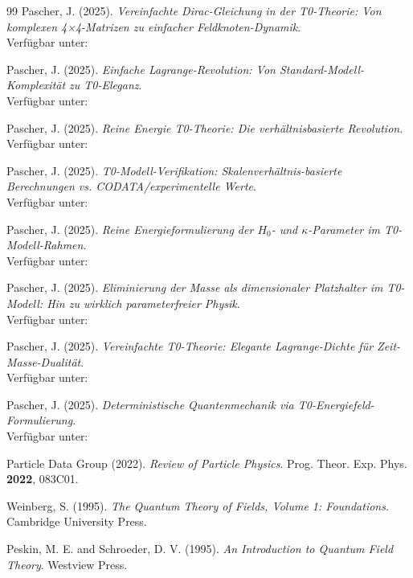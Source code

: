	\begin{thebibliography}{99}
		Pascher, J. (2025). \textit{Vereinfachte Dirac-Gleichung in der T0-Theorie: Von komplexen 4×4-Matrizen zu einfacher Feldknoten-Dynamik}. \\
		Verfügbar unter: 
		
		Pascher, J. (2025). \textit{Einfache Lagrange-Revolution: Von Standard-Modell-Komplexität zu T0-Eleganz}. \\
		Verfügbar unter: 
		
		Pascher, J. (2025). \textit{Reine Energie T0-Theorie: Die verhältnisbasierte Revolution}. \\
		Verfügbar unter: 
		
		Pascher, J. (2025). \textit{T0-Modell-Verifikation: Skalenverhältnis-basierte Berechnungen vs. CODATA/experimentelle Werte}. \\
		Verfügbar unter: 
		
		Pascher, J. (2025). \textit{Reine Energieformulierung der $H_0$- und $\kappa$-Parameter im T0-Modell-Rahmen}. \\
		Verfügbar unter: 
		
		Pascher, J. (2025). \textit{Eliminierung der Masse als dimensionaler Platzhalter im T0-Modell: Hin zu wirklich parameterfreier Physik}. \\
		Verfügbar unter: 
		
		Pascher, J. (2025). \textit{Vereinfachte T0-Theorie: Elegante Lagrange-Dichte für Zeit-Masse-Dualität}. \\
		Verfügbar unter: 
		
		Pascher, J. (2025). \textit{Deterministische Quantenmechanik via T0-Energiefeld-Formulierung}. \\
		Verfügbar unter: 
		
		Particle Data Group (2022). \textit{Review of Particle Physics}. Prog. Theor. Exp. Phys. \textbf{2022}, 083C01.
		
		Weinberg, S. (1995). \textit{The Quantum Theory of Fields, Volume 1: Foundations}. Cambridge University Press.
		
		Peskin, M. E. and Schroeder, D. V. (1995). \textit{An Introduction to Quantum Field Theory}. Westview Press.
		

\end{thebibliography}
